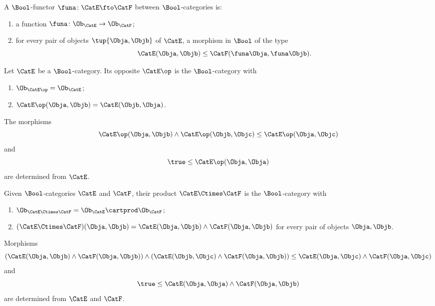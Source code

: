 \begin{ctdefinition}
\label{def:bool-functor}
A $\Bool$-functor $\funa \colon \CatE \fto \CatF$ between $\Bool$-categories is:

\constit
\begin{enumerate}
\item a function $\funa \colon \Ob_\CatE \to \Ob_\CatF$;
\item for every pair of objects $\tup{\Obja, \Objb}$ of $\CatE$, a morphism in $\Bool$ of the type
\begin{equation}
\CatE(\Obja, \Objb) \leq \CatF(\funa \Obja, \funa \Objb). 
\end{equation}
\end{enumerate}
\end{ctdefinition}


\begin{ctdefinition}
\label{def:bool-cat-opposite}
Let $\CatE$ be a $\Bool$-category. Its opposite $\CatE\op$ is the $\Bool$-category with 
\begin{enumerate}
\item $\Ob_{\CatE\op} = \Ob_\CatE$;
\item $\CatE\op(\Obja, \Objb) = \CatE(\Objb, \Obja)$.
\end{enumerate}

The morphisms 
\begin{equation}
\CatE\op(\Obja, \Objb) \wedge \CatE\op(\Objb, \Objc) \leq \CatE\op(\Obja, \Objc)
\end{equation}
and
\begin{equation}
\true \leq \CatE\op(\Obja, \Obja)
\end{equation}
are determined from $\CatE$.
\end{ctdefinition}

\begin{ctdefinition}
\label{def:bool-cat-product}
Given $\Bool$-categories $\CatE$ and $\CatF$, their product $\CatE \Ctimes \CatF$ is the $\Bool$-category with 
\begin{enumerate}
\item $\Ob_{\CatE \Ctimes \CatF} = \Ob_\CatE \cartprod \Ob_\CatF$;
\item $(\CatE \Ctimes \CatF)(\Obja, \Objb) = \CatE (\Obja, \Objb) \wedge \CatF (\Obja, \Objb)$ for every pair of objects $\Obja, \Objb$. 
\end{enumerate}
Morphisms 
\begin{equation}
(\CatE(\Obja, \Objb) \wedge \CatF(\Obja, \Objb)) \wedge (\CatE(\Objb, \Objc) \wedge \CatF(\Obja, \Objb)) \leq \CatE(\Obja, \Objc) \wedge  \CatF(\Obja, \Objc)
\end{equation}
and
\begin{equation}
\true \leq \CatE(\Obja, \Obja) \wedge \CatF(\Obja, \Objb)
\end{equation}
are determined from $\CatE$ and $\CatF$.
\end{ctdefinition}


